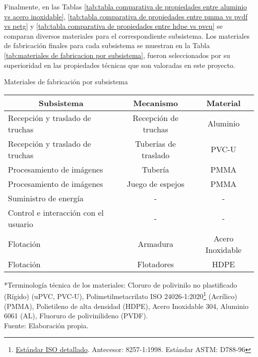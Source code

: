 Finalmente, en las Tablas \ref{tab:tabla comparativa de propiedades entre aluminio vs acero inoxidable}, \ref{tab:tabla comparativa de propiedades entre pmma vs pvdf vs petg} y \ref{tab:tabla comparativa de propiedades entre hdpe vs pvcu} se comparan diversos materiales para el correspondiente subsistema. Los materiales de fabricación finales para cada subsistema se muestran en la Tabla \ref{tab:materiales de fabricacion por subsistema}, fueron seleccionados por su superioridad en las propiedades técnicas que son valoradas en este proyecto. 

\begin{savenotes}
	\begin{mytable}[H]
		\footnotesize\centering
		\caption{Materiales de fabricación por subsistema}
		\label{tab:materiales de fabricacion por subsistema}
		\begin{tabular}{|l|c|c|}
			\hline
			\multicolumn{1}{|c|}{\textbf{Subsistema}} & \multicolumn{1}{c|}{\textbf{Mecanismo}} & \textbf{Material} \\ \hline
			Recepción y traslado de truchas      & Recepción de truchas   & Aluminio  \\ \hline
			Recepción y traslado de truchas      & Tuberías de traslado   & PVC-U    \\ \hline
			Procesamiento de imágenes            & Tubería                & PMMA  \\ \hline
			Procesamiento de imágenes            & Juego de espejos       & PMMA  \\ \hline
			Suministro de energía                & \multicolumn{1}{c|}{-} & -    \\ \hline
			Control e interacción con el usuario & \multicolumn{1}{c|}{-} & -  \\ \hline
			Flotación                            & Armadura               & Acero Inoxidable \\ \hline
			Flotación                            & Flotadores             & HDPE  \\ \hline
		\end{tabular}
		\begin{myflushcenteraftertable}
		*Terminología técnica de los materiales: Cloruro de polivinilo no plastificado (Rígido) (uPVC, PVC-U), Polimetilmetacrilato ISO 24026-1:2020\footnote{\href{https://www.iso.org/standard/77547.html}{Estándar ISO detallado}. Antecesor: 8257-1:1998. Estándar ASTM: D788-96} (Acrílico) (PMMA), Polietileno de alta densidad (HDPE), Acero Inoxidable 304, Aluminio 6061 (AL), Fluoruro de polivinilideno (PVDF).\\	
		Fuente: Elaboración propia.
		\end{myflushcenteraftertable}
	\end{mytable}
\end{savenotes}

